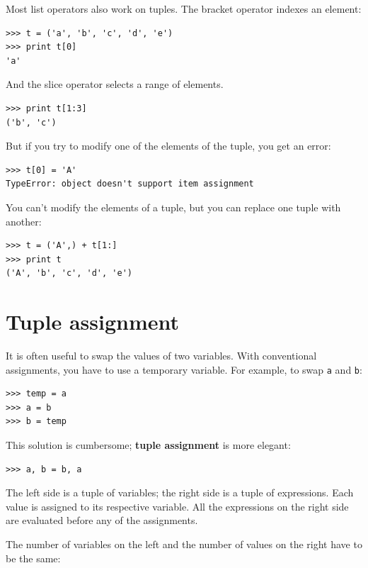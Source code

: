 \documentclass[10pt]{book}
\begin{document}
Most list operators also work on tuples.  The bracket operator
indexes an element:

\begin{verbatim}
>>> t = ('a', 'b', 'c', 'd', 'e')
>>> print t[0]
'a'
\end{verbatim}
%
And the slice operator selects a range of elements.

\begin{verbatim}
>>> print t[1:3]
('b', 'c')
\end{verbatim}
%
But if you try to modify one of the elements of the tuple, you get
an error:

\begin{verbatim}
>>> t[0] = 'A'
TypeError: object doesn't support item assignment
\end{verbatim}
%
You can't modify the elements of a tuple, but you can replace
one tuple with another:

\begin{verbatim}
>>> t = ('A',) + t[1:]
>>> print t
('A', 'b', 'c', 'd', 'e')
\end{verbatim}
%

\section{Tuple assignment}
\label{tuple.assignment}

It is often useful to swap the values of two variables.
With conventional assignments, you have to use a temporary
variable.  For example, to swap {\tt a} and {\tt b}:

\begin{verbatim}
>>> temp = a
>>> a = b
>>> b = temp
\end{verbatim}
%
This solution is cumbersome; {\bf tuple assignment} is more elegant:

\begin{verbatim}
>>> a, b = b, a
\end{verbatim}
%
The left side is a tuple of variables; the right side is a tuple of
expressions.  Each value is assigned to its respective variable.
All the expressions on the right side are evaluated before any
of the assignments.

The number of variables on the left and the number of
values on the right have to be the same:
\end{document}
